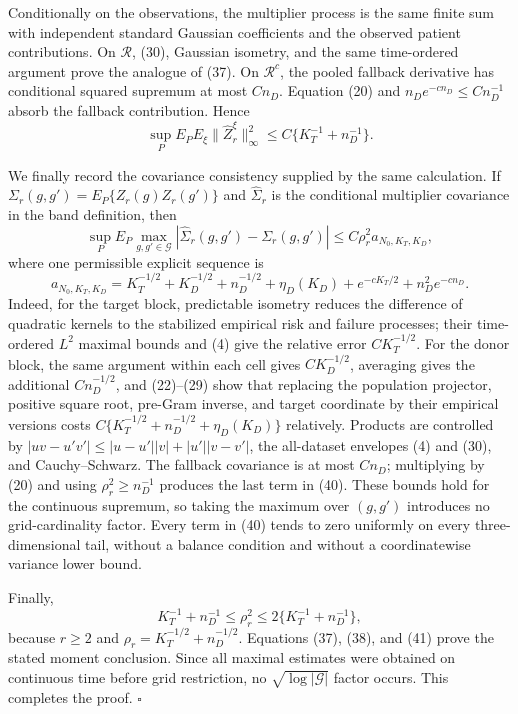 Conditionally on the observations, the multiplier process is the same finite sum with independent standard Gaussian coefficients and the observed patient contributions.  On \(\mathcal R\), (30), Gaussian isometry, and the same time-ordered argument prove the analogue of (37).  On \(\mathcal R^c\), the pooled fallback derivative has conditional squared supremum at most \(Cn_D\).  Equation (20) and
\(n_De^{-cn_D}\le Cn_D^{-1}\) absorb the fallback contribution.  Hence
\[
 \sup_PE_PE_\xi\|\widehat Z_r^\xi\|_\infty^2
 \le C\{K_T^{-1}+n_D^{-1}\}.
\tag{38}
\]

We finally record the covariance consistency supplied by the same calculation.  If
\(\Sigma_r(g,g')=E_P\{Z_r(g)Z_r(g')\}\) and
\(\widehat\Sigma_r\) is the conditional multiplier covariance in the band definition, then
\[
 \sup_PE_P\max_{g,g'\in\mathcal G}
 |\widehat\Sigma_r(g,g')-\Sigma_r(g,g')|
 \le C\rho_r^2 a_{N_0,K_T,K_D},
\tag{39}
\]
where one permissible explicit sequence is
\[
 a_{N_0,K_T,K_D}
 =K_T^{-1/2}+K_D^{-1/2}+n_D^{-1/2}+\eta_D(K_D)
  +e^{-cK_T/2}+n_D^2e^{-cn_D}.
\tag{40}
\]
Indeed, for the target block, predictable isometry reduces the difference of quadratic kernels to the stabilized empirical risk and failure processes; their time-ordered \(L^2\) maximal bounds and (4) give the relative error \(CK_T^{-1/2}\).  For the donor block, the same argument within each cell gives \(CK_D^{-1/2}\), averaging gives the additional \(Cn_D^{-1/2}\), and (22)--(29) show that replacing the population projector, positive square root, pre-Gram inverse, and target coordinate by their empirical versions costs
\(C\{K_T^{-1/2}+n_D^{-1/2}+\eta_D(K_D)\}\) relatively.  Products are controlled by
\(|uv-u'v'|\le |u-u'||v|+|u'||v-v'|\), the all-dataset envelopes (4) and (30), and Cauchy--Schwarz.  The fallback covariance is at most \(Cn_D\); multiplying by (20) and using \(\rho_r^2\ge n_D^{-1}\) produces the last term in (40).  These bounds hold for the continuous supremum, so taking the maximum over \((g,g')\) introduces no grid-cardinality factor.  Every term in (40) tends to zero uniformly on every three-dimensional tail, without a balance condition and without a coordinatewise variance lower bound.

Finally,
\[
 K_T^{-1}+n_D^{-1}\le\rho_r^2
 \le2\{K_T^{-1}+n_D^{-1}\},
\tag{41}
\]
because \(r\ge2\) and
\(\rho_r=K_T^{-1/2}+n_D^{-1/2}\).  Equations (37), (38), and (41) prove the stated moment conclusion.  Since all maximal estimates were obtained on continuous time before grid restriction, no \(\sqrt{\log|\mathcal G|}\) factor occurs.  This completes the proof. \(\square\)